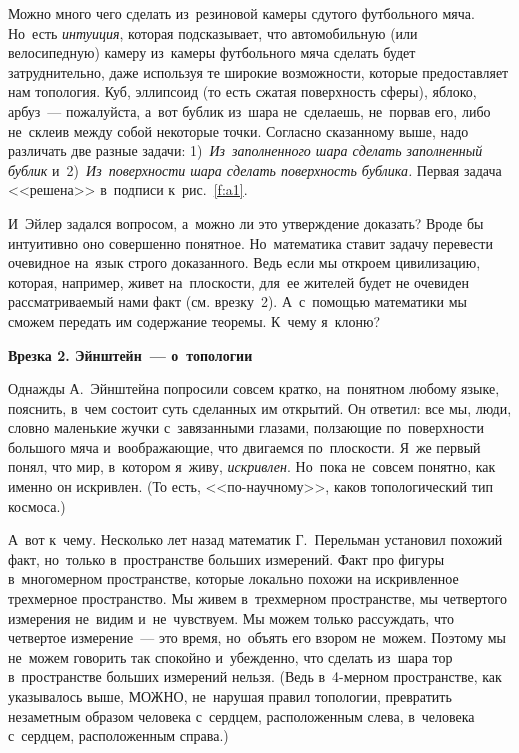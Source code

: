 Можно много чего сделать из~резиновой камеры сдутого футбольного мяча. Но~есть \textit{интуиция},
которая подсказывает, что автомобильную (или велосипедную) камеру из~камеры футбольного мяча
сделать будет затруднительно, даже используя те широкие возможности, которые предоставляет нам
топология. Куб, эллипсоид (то есть сжатая поверхность сферы), яблоко, арбуз~--- пожалуйста, а~вот
бублик из~шара не~сделаешь, не~порвав его, либо не~склеив между собой некоторые точки. Согласно
сказанному выше, надо различать две разные задачи: 1)~\textit{Из~заполненного шара сделать
заполненный бублик} и~2)~\textit{Из~поверхности шара сделать поверхность бублика.} Первая задача <<решена>>
в~подписи к~рис.~\ref{f:a1}.


И~Эйлер задался вопросом, а~можно ли это утверждение доказать? Вроде бы интуитивно оно совершенно
понятное.
 Но~математика ставит задачу перевести очевидное на~язык строго доказанного. Ведь если мы
откроем цивилизацию, которая, например, живет на~плоскости, для~ее жителей будет не очевиден
рассматриваемый нами факт (см. врезку~2). А~с~помощью математики мы сможем передать им содержание
теоремы. К~чему я~клоню?

\medskip

\hrulefill

\smallskip

\textbf{Врезка 2. Эйнштейн~--- о~топологии}

Однажды А.~Эйнштейна попросили совсем кратко, на~понятном любому языке, пояснить, в~чем состоит
суть сделанных им открытий. Он ответил: все мы, люди, словно маленькие жучки с~завязанными глазами,
ползающие по~поверхности большого мяча и~воображающие, что двигаемся по~плоскости. Я~же первый
понял, что мир, в~котором я~живу, \textit{искривлен}. Но~пока не~совсем понятно, как именно он искривлен.
(То есть, <<по-научному>>, каков топологический тип космоса.)

\smallskip

\hrulefill

\medskip

А~вот к~чему. Несколько лет назад математик Г.~Перельман установил похожий факт, но~только
в~пространстве больших измерений. Факт про фигуры в~многомерном пространстве, которые
локально похожи на искривленное трехмерное пространство.
 Мы живем в~трехмерном пространстве,
мы четвертого измерения не~видим и~не~чувствуем. Мы можем только рассуждать, что четвертое
измерение~--- это время, но~объять его взором не~можем.
 Поэтому мы не~можем говорить так
спокойно и~убежденно, что сделать из~шара тор в~пространстве больших измерений нельзя. (Ведь
в~4-мерном пространстве, как указывалось выше, МОЖНО, не~нарушая правил топологии, превратить
незаметным образом человека с~сердцем, расположенным слева, в~человека с~сердцем, расположенным
справа.)

